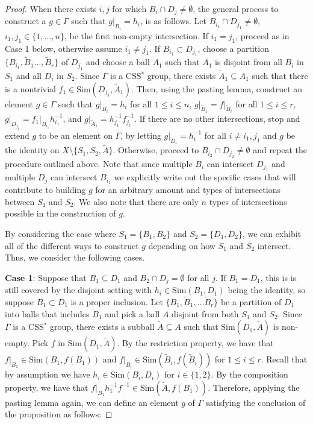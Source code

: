 \documentclass[10pt,a4paper]{amsart}
\begin{document}
\begin{proof}
    When there exists $i,j$ for which $B_i \cap D_j \neq \emptyset$, the general process to construct a $g \in \Gamma$ such that $g\vert_{B_i} =h_i$, is as follows. Let $B_{i_1} \cap D_{j_1} \neq \emptyset$, $i_1,j_1 \in \{ 1, \dots , n\}$, be the first non-empty intersection. If $i_1=j_1$, proceed as in Case 1 below, otherwise assume $i_1 \neq j_1$. If $B_{i_1} \subset D_{j_1}$, choose a partition $\{B_{i_1}, \tilde B_1\dots ,\tilde B_r \}$ of $D_{j_1}$ and choose a ball $A_1$ such that $A_1$ is disjoint from all $B_i$ in $S_1$ and all $D_i$ in $S_2$. Since $\Gamma$ is a CSS$^*$ group, there exists $\tilde A_1 \subseteq A_1$ such that there is a nontrivial $f_1 \in \text{Sim}(D_{j_1},\tilde A_1)$. Then, using the pasting lemma, construct an element $g \in \Gamma$ such that $g\vert_{B_i} =h_{i}$ for all $1 \leq i \leq n$, $g\vert_{\tilde B_1} = f\vert_{\tilde B_i}$ for all $1 \leq i \leq r$, $g\vert_{D_{j_1}} = f_1\vert_{B_{i_1}}h^{-1}_{i_1}$, and $g\vert_{\tilde A_1} =h_{j_1}^{-1}f_{j_i}^{-1}$. If there are no other intersections, stop and extend $g$ to be an element on $\Gamma$, by letting $g\vert_{D_i} = h_i^{-1}$ for all $i \neq i_1,j_1$ and $g$ be the identity on $X \setminus\{S_1, S_2, \tilde A\}$. Otherwise, proceed to $B_{i_2}\cap D_{j_2} \neq \emptyset$ and repeat the procedure outlined above. Note that since multiple $B_i$ can intersect $D_{j_1}$ and multiple  $D_j$ can intersect $B_{i_1}$ we explicitly write out the specific cases that will contribute to building $g$ for an arbitrary amount and types of intersections between $S_1$ and $S_2$. We also note that there are only $n$ types of intersections possible in the construction of $g$.
    
    
   
    
    By considering the case where $S_1 = \{B_1, B_2\}$ and $S_2 = \{D_1, D_2\}$, we can exhibit all of the different ways to construct $g$ depending on how $S_1$ and $S_2$ intersect. Thus, we consider the following cases. 
    
    
   


    \noindent\textbf{Case 1}: Suppose that $B_1 \subseteq D_1$ and $B_2 \cap D_j = \emptyset$ for all $j$.  If $B_1 = D_1$, this is is still covered by the disjoint setting with $h_i \in \text{Sim}(B_1,D_1)$ being the identity, so suppose $B_1 \subset D_1$ is a proper inclusion. Let $\{B_1, \tilde B_1, \dots \tilde B_r \}$ be a partition of $D_1$ into balls that includes $B_1$ and pick a ball $A$ disjoint from both $S_1$ and $S_2$. Since $\Gamma$ is a CSS$^*$ group, there exists a subball $\tilde A \subseteq A$ such that $\text{Sim}(D_1,\tilde A)$ is non-empty. Pick $f$ in $\text{Sim}(D_1,\tilde A)$. By the restriction property, we have that $f\vert_{B_1} \in \text{Sim}(B_1, f(B_1))$ and $f\vert_{\tilde B_i} \in \text{Sim}(\tilde B_i, f(\tilde B_i))$ for $1 \leq i \leq r$. Recall that by assumption we have $h_i \in \text{Sim}(B_i,D_i)$ for $i \in \{1,2\}$. By the composition property, we have that $f\vert_{B_1}h_1^{-1}f^{-1} \in \text{Sim}(\tilde A, f(B_1))$. Therefore, applying the pasting lemma again, we can define an element $g$ of $\Gamma$ satisfying the conclusion of the proposition as follows:



\end{proof}
\end{document}
